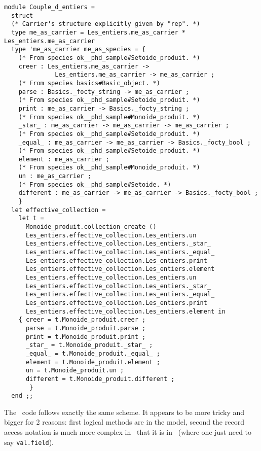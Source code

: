 {\begin{lstlisting}[language=MyOCaml, title=\ocaml\ code for collections]
module Couple_d_entiers =
  struct
  (* Carrier's structure explicitly given by "rep". *)
  type me_as_carrier = Les_entiers.me_as_carrier * Les_entiers.me_as_carrier
  type 'me_as_carrier me_as_species = {
    (* From species ok__phd_sample#Setoide_produit. *)
    creer : Les_entiers.me_as_carrier ->
              Les_entiers.me_as_carrier -> me_as_carrier ;
    (* From species basics#Basic_object. *)
    parse : Basics._focty_string -> me_as_carrier ;
    (* From species ok__phd_sample#Setoide_produit. *)
    print : me_as_carrier -> Basics._focty_string ;
    (* From species ok__phd_sample#Monoide_produit. *)
    _star_ : me_as_carrier -> me_as_carrier -> me_as_carrier ;
    (* From species ok__phd_sample#Setoide_produit. *)
    _equal_ : me_as_carrier -> me_as_carrier -> Basics._focty_bool ;
    (* From species ok__phd_sample#Setoide_produit. *)
    element : me_as_carrier ;
    (* From species ok__phd_sample#Monoide_produit. *)
    un : me_as_carrier ;
    (* From species ok__phd_sample#Setoide. *)
    different : me_as_carrier -> me_as_carrier -> Basics._focty_bool ;
    }
  let effective_collection =
    let t =
      Monoide_produit.collection_create ()
      Les_entiers.effective_collection.Les_entiers.un
      Les_entiers.effective_collection.Les_entiers._star_
      Les_entiers.effective_collection.Les_entiers._equal_
      Les_entiers.effective_collection.Les_entiers.print
      Les_entiers.effective_collection.Les_entiers.element
      Les_entiers.effective_collection.Les_entiers.un
      Les_entiers.effective_collection.Les_entiers._star_
      Les_entiers.effective_collection.Les_entiers._equal_
      Les_entiers.effective_collection.Les_entiers.print
      Les_entiers.effective_collection.Les_entiers.element in
    { creer = t.Monoide_produit.creer ;
      parse = t.Monoide_produit.parse ;
      print = t.Monoide_produit.print ;
      _star_ = t.Monoide_produit._star_ ;
      _equal_ = t.Monoide_produit._equal_ ;
      element = t.Monoide_produit.element ;
      un = t.Monoide_produit.un ;
      different = t.Monoide_produit.different ;
       }
  end ;;
\end{lstlisting}
}

The \coq\ code follows exactly the same scheme. It appears to be more
tricky and bigger for 2 reasons: first logical methods are in the
model, second the record access notation is much more complex in
\coq\ that it is in \ocaml\ (where one just need to say
{\tt val.field}).

